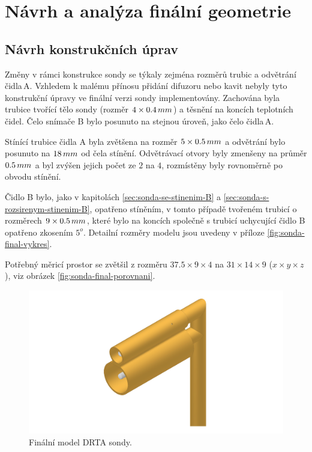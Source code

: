 \section{Návrh a analýza finální geometrie} \label{sec:finalni-geometrie}
    \subsection{Návrh konstrukčních úprav}
        Změny v rámci konstrukce sondy se týkaly zejména rozměrů trubic a odvětrání čidla\,A. Vzhledem k malému přínosu přidání difuzoru nebo kavit nebyly tyto konstrukční úpravy ve finální verzi sondy implementovány. Zachována byla trubice tvořící tělo sondy (rozměr $4 \times 0.4 \, mm$) a těsnění na koncích teplotních čidel. Čelo snímače B bylo posunuto na stejnou úroveň, jako čelo čidla\,A. 
        
        Stínící trubice čidla A byla zvětšena na rozměr $5 \times 0.5 \, mm$ a odvětrání bylo posunuto na $18 \, mm$ od čela stínění. Odvětrávací otvory byly zmenšeny na průměr $0.5 \, mm$ a byl zvýšen jejich počet ze $2$ na $4$, rozmístěny byly rovnoměrně po obvodu stínění.

        Čidlo B bylo, jako v kapitolách \ref{sec:sonda-se-stinenim-B} a \ref{sec:sonda-s-rozsirenym-stinenim-B}, opatřeno stíněním, v tomto případě tvořeném trubicí o rozměrech $9 \times 0.5 \, mm$, které bylo na koncích společně s trubicí uchycující čidlo B opatřeno zkosením $5^o$. Detailní rozměry modelu jsou uvedeny v příloze \ref{fig:sonda-final-vykres}.

        Potřebný měricí prostor se zvětšil z rozměru $37.5 \times 9 \times 4$ na $31 \times 14 \times 9$ ($x \times y \times z$), viz obrázek \ref{fig:sonda-final-porovnani}.

        \begin{figure}[ht!]
            \centering
            \includegraphics[width=\textwidth]{500_FINAL/sonda_final.png}
            \caption{Finální model DRTA sondy.}
            \label{fig:sonda-final}
        \end{figure}

